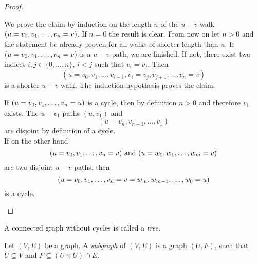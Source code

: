 \begin{proof}
\begin{plist}
\item We prove the claim by induction on the length $n$ of the $u-v$-walk $(u=v_0,\seq{v}=v)$. If $n=0$ the result is clear. From now on let $n>0$ and the statement be already proven for all walks of shorter length than $n$. If $(u=v_0,\seq{v}=v)$ is a $u-v$-path, we are finished. If not, there exist two indices $i,j\in\lbrace 0,\ldots,n\rbrace$, $i<j$ such that $v_i=v_j$. Then
\begin{equation*}
(u=v_0,v_1,\ldots,v_{i-1},v_i=v_j,v_{j+1},\ldots,v_n=v)
\end{equation*}
is a shorter $u-v$-walk. The induction hypothesis proves the claim.
\item If $(u=v_0,\seq{v}=u)$ is a cycle, then by definition $n>0$ and therefore $v_1$ exists. The $u-v_1$-paths $(u,v_1)$ and
\[(u=v_n,v_{n-1},\ldots,v_1)\]
are disjoint by definition of a cycle.\\
If on the other hand 
\begin{equation*}
(u=v_0,\seq{v}=v) \text{ and } (u=w_0,\seq[m]{w}=v) 
\end{equation*}
are two disjoint $u-v$-paths, then
\begin{equation*}
(u=v_0,\seq{v}=v=w_m,w_{m-1},\ldots,w_0=u)
\end{equation*}
is a cycle.
\end{plist}
\end{proof}

\begin{defin}
A connected graph without cycles is called a \emph{tree.}
\end{defin}


\begin{defin}
Let $(V,E)$ be a graph. A \emph{subgraph} of $(V,E)$ is a graph $(U,F)$, such that $U\subseteq V$ and $F\subseteq (U\times U)\cap E.$
\end{defin}

